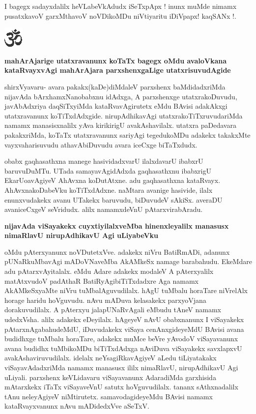 I bagegx sadayxdalilx heVLabeVkAdudx iSeTxpApx ! inunx muMde nimamx pusatxkavoV garxMthavoV noVDikoMDu niVtiyaritu iDiVpapx! kaqSANx !.

\begin{center}
\includegraphics{om.eps}
\end{center}

\noindent
{\bf\large{mahArAjarige utatxravanunx koTaTx bagegx oMdu avaloVkana kataRvayxvAgi mahArAjara parxshenxgaLige utatxrisuvudAgide}}

shirxVyavaru- avara pakakx(kaDe)diMdaleV parxshenx baMdidadxriMda nijavAda bArxhamxNanobabxnu idAdxga, A parxshenxge utatxrakoDuvudu, javAbAdxriya daqSiTxyiMda kataRvavAgirutetx eMdu BAvisi adakAkxgi utatxravanunx koTiTxdAdxgide. nirupAdhikavAgi utatxrakoTiTxruvudariMda namamx manasisxnalilx yAva kirikirigU avakAshavilalx. utatxra paDedavara pakakxriMda, koTaTx utatxravanunx  sariyAgi tegedukoMDu adakekx takakxMte vayxvaharisuvudu athavAbiDuvudu avara iceCxge biTaTxdudx.

obabx gaqhasathxna manege hasividadxvarU ilalxdavarU ibabxrU baruvuDuMTu. UTada samayavAgidAdxda gaqhasathxnu ibabxrigU EkarUoavAgiyeV AhAvxna koDutAtxne. adu gaqhasathxna kataRvayx. AhAvxnakoDabeVku koTiTxdAdxne. naMtara avanige hasivide, ilalx enunxvudakekx avanu UTakekx baruvudu, biDuvudeV sAkiSx. averaDU avaniceCxgeV seVridudx. alilx namamxdeVnU pAtarxvirabAradu.

\noindent
{\bf\large{nijavAda viSayakekx cuyxtiyilalxveMba hinenxleyalilx manasusx nimaRlavU nirupAdhikavU Agi uLiyabeVku}}\label{page250}

oMdu pAterxyanunx noVDutetxVve. adakekx niVru BatiRmADi, adanunx pUNaRkuMbavAgi mADoVNaveMba AkAMkeSx namage barabahudu. EkeMdare adu pAtarxvAyitalalx. eMdu Adare adakekx modaleV A pAterxyalilx matAtxvudoV padAthaR BatiRyAgibiTiTxdadxre Aga namamx AkAMkeSxyaMte niVru tuMbalAguvudilalx. hAgU tuMbalu horaTare niVrelAlx horage haridu hoVguvudu. nAvu mADuva kelasakekx parxyoVjana dorakuvudilalx. A pAterxyu jalapUNaRvAgali eMbudu tAneV namamx udedxVsha. alilx adakekx eDeyilalx. hAgeyeV nAvU obabxnanunx I viSayakekx pAtarxnAgabahudeMdU, iDuvudakekx viSaya cenAnxgideyeMdU BAvisi avana budidhxge tuMbalu horaTare, adakekx muMce beVre yAvodoV viSayavanunx avana budidhx tuMbikoMDu biTiTxdAdxga nAviDuva viSayakekx savxlapxvU avakAshaviruvudilalx. idelalx neYsagiRkavAgiyeV aLedu tiLiyatakakx viSayavAdadxriMda namamx manasusx ililx nimaRlavU, nirupAdhikavU Agi uLiyali. parxshenx keVLidavaru viSayavanunx AdaradiMda garxhisida mAtarxkekx iTaTx viSayaveVnU satutx hoVguvudilalx. tananx sAthxnadalilx tAnu neleyAgiyeV niMtirutetx. samavodagideyeMdu BAvisi namamx kataRvayxvanunx nAvu mADidedxVve aSeTxV.

